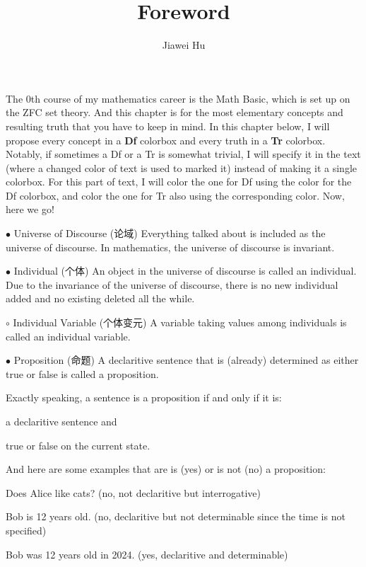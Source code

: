 \documentclass{article}
\title{\LARGE Foreword}
\author{\large Jiawei Hu}
\begin{document}
\maketitle

The 0th course of my mathematics career is the Math Basic, which is set up on the ZFC set theory. And this chapter is for the most elementary concepts and resulting truth that you have to keep in mind. In this chapter below, I will propose every concept in a \textbf{Df} colorbox and every truth in a \textbf{Tr} colorbox. Notably, if sometimes a Df or a Tr is somewhat trivial, I will specify it in the text (where a changed color of text is used to marked it) instead of making it a single colorbox. For this part of text, I will color the one for Df using the color for the Df colorbox, and color the one for Tr also using the corresponding color.
Now, here we go!

\begin{Df}{$\bullet$ Universe of Discourse (论域)}
    Everything talked about is included as the universe of discourse. In mathematics, the universe of discourse is invariant.
\end{Df}

\begin{Df}{$\bullet$ Individual (个体)}
    An object in the universe of discourse is called an individual. \textcolor{Rtr}{Due to the invariance of the universe of discourse, there is no new individual added and no existing deleted all the while.}
\end{Df}

\begin{Df}{$\circ$ Individual Variable (个体变元)}
    A variable taking values among individuals is called an individual variable.
\end{Df}

\begin{Df}{$\bullet$ Proposition (命题)}
A declaritive sentence that is (already) determined as either true or false is called a proposition.
\end{Df}

Exactly speaking, a sentence is a proposition if and only if it is:
\begin{compactenum}
    \item a declaritive sentence and 
    \item true or false on the current state.
\end{compactenum}
And here are some examples that are is (yes) or is not (no) a proposition:
\begin{compactitem}
    \item Does Alice like cats? (no, not declaritive but interrogative)
    \item Bob is 12 years old. (no, declaritive but not determinable since the time is not specified)
    \item Bob was 12 years old in 2024. (yes, declaritive and determinable)
\end{compactitem}
\end{document}
